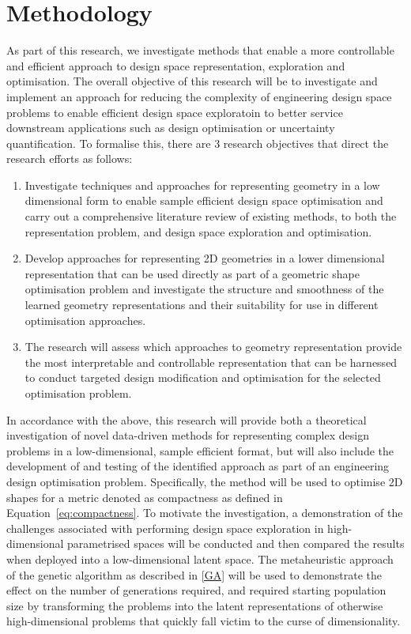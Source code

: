 \documentclass{article}
\begin{document}
\section{Methodology}
As part of this research, we investigate methods that enable a more controllable and efficient approach to design space representation, exploration and optimisation. The overall objective of this research will be to investigate and implement an approach for reducing the complexity of engineering design space problems to enable efficient design space exploratoin to better service downstream applications such as design optimisation or uncertainty quantification. To formalise this, there are 3 research objectives that direct the research efforts as follows:
\begin{enumerate}
    \item Investigate techniques and approaches for representing geometry in a low dimensional form to enable sample efficient design space optimisation and carry out a comprehensive literature review of existing methods, to both the representation problem, and design space exploration and optimisation.
    \item Develop approaches for representing 2D geometries in a lower dimensional representation that can be used directly as part of a geometric shape optimisation problem and investigate the structure and smoothness of the learned geometry representations and their suitability for use in different optimisation approaches.
    \item The research will assess which approaches to geometry representation provide the most interpretable and controllable representation that can be harnessed to conduct targeted design modification and optimisation for the selected optimisation problem.
\end{enumerate}

In accordance with the above, this research will provide both a theoretical investigation of novel data-driven methods for representing complex design problems in a low-dimensional, sample efficient format, but will also include the development of and testing of the identified approach as part of an engineering design optimisation problem. Specifically, the method will be used to optimise 2D shapes for a metric denoted as compactness as defined in Equation~\eqref{eq:compactness}. To motivate the investigation, a demonstration of the challenges associated with performing design space exploration in high-dimensional parametrised spaces will be conducted and then compared the results when deployed into a low-dimensional latent space. The metaheuristic approach of the genetic algorithm as described in \ref{GA} will be used to demonstrate the effect on the number of generations required, and required starting population size by transforming the problems into the latent representations of otherwise high-dimensional problems that quickly fall victim to the curse of dimensionality.
\end{document}
